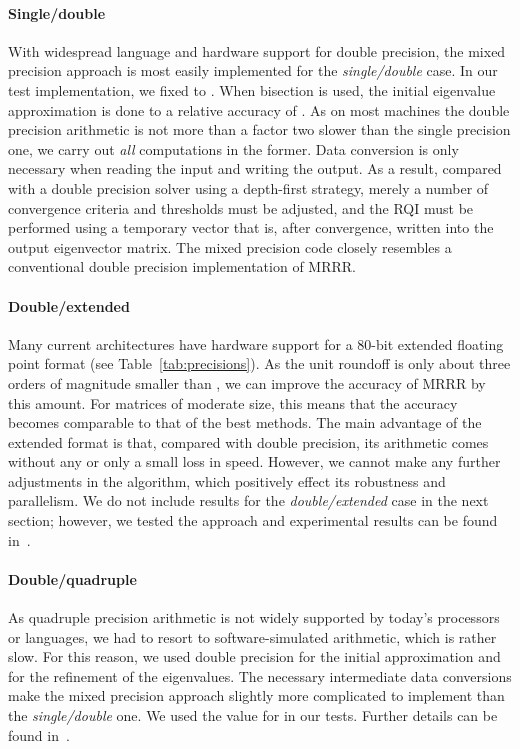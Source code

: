 \documentclass[final]{siamltex}
\begin{document}
\paragraph{Single/double} With widespread language and hardware support for
  double precision, the mixed precision approach is most easily implemented
  for the {\it single/double} case. In our test implementation, we fixed
   to . When bisection is used, the initial eigenvalue
  approximation is done to a relative accuracy of . As
  on most machines the double precision arithmetic is not more than a factor two
  slower than the single precision one, we carry out {\it all} computations in
  the former. Data conversion is only necessary when reading the input and
  writing the output. As a result, compared with a double precision solver
  using a depth-first strategy,
  merely a number of convergence criteria and thresholds must be
  adjusted, and the RQI must be performed using a temporary vector that is,
  after convergence, written into the output eigenvector matrix. The mixed precision code
  closely resembles a conventional double precision implementation of MRRR.
\paragraph{Double/extended} Many current architectures have hardware
  support for a 80-bit extended floating point format (see
  Table~\ref{tab:precisions}). As the unit roundoff  is only
  about three orders of magnitude smaller than , we can 
  improve the accuracy of MRRR by this amount. For matrices of moderate size, this means
  that the accuracy becomes comparable to that of the best methods. The main
  advantage of the extended format is that, compared with double precision, its
  arithmetic comes without any or only a small loss in speed. However, we
  cannot make any further adjustments in the algorithm, which 
  positively effect its robustness and parallelism. 
  We do not include results for the {\it double/extended}
case in the next section; however, we tested the approach and experimental
results can be found in~\cite{mydiss,mixedtr}.  
\paragraph{Double/quadruple} As quadruple precision arithmetic is not
  widely supported by today's processors or languages, we had to resort to
  software-simulated arithmetic, which is rather slow. For this reason, we
  used double precision for the initial approximation and for the refinement
  of the eigenvalues. The necessary intermediate data conversions make the
  mixed precision approach slightly more complicated to implement than
  the {\it single/double} one. 
  We used the value  for  in our tests. Further details
  can be found in~\cite{mixedtr}.  
\end{document}

